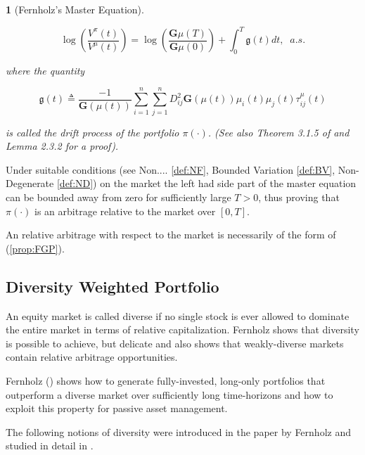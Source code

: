 \documentclass[british]{amsart}
\numberwithin{equation}{section}
\numberwithin{figure}{section}
\theoremstyle{plain}
\newtheorem{thm}{\protect\theoremname}[section]
\theoremstyle{definition}
\theoremstyle{plain}
\theoremstyle{plain}
\theoremstyle{plain}
\theoremstyle{remark}
\theoremstyle{plain}
\providecommand{\theoremname}{Theorem}
\begin{document}
\begin{thm} [Fernholz's Master Equation] \label{thm:masterequation}

  \begin{equation}
\log\left(\frac{V^{\pi}(t)}{V^{\mu}(t)}\right)=\log\left(\frac{\mathbf{G}\mu(T)}{\mathbf{G}\mu(0)}\right)+\int_{0}^{T}\mathfrak{g}(t)dt,\;\;a.s.
\end{equation}

where the quantity

  \begin{equation}
\mathfrak{g}(t)\triangleq\frac{-1}{\mathbf{G}(\mu(t))}\sum_{i=1}^{n}\sum_{j=1}^{n}D_{ij}^{2}\mathbf{G}(\mu(t))\mu_{i}(t)\mu_{j}(t)\tau_{ij}^{\mu}(t)
\end{equation}

is called the \textit{drift process} of the portfolio $\pi(\cdot)$. (See also
Theorem 3.1.5 of \cite{fernholz2002} and Lemma 2.3.2 for a proof).

\end{thm}

Under suitable conditions (see Non.... \ref{def:NF}, Bounded Variation
\ref{def:BV}, Non-Degenerate \ref{def:ND}) on the market the left had side part
of the master equation can be bounded away from zero for sufficiently large
$T>0$, thus proving that $\pi(\cdot)$ is an arbitrage relative to the market
over $[0,T]$.

An relative arbitrage with respect to the market is necessarily of the form of
(\ref{prop:FGP}).

\newpage 

\subsection{Diversity Weighted Portfolio}

An equity market is called diverse if no single stock is ever allowed to
dominate the entire market in terms of relative capitalization. Fernholz
\cite{fernholz2005} shows that diversity is possible to achieve, but delicate
and also shows that weakly-diverse markets contain relative arbitrage
opportunities.

Fernholz (\cite{fernholz2002}) shows how to generate fully-invested, long-only
portfolios that outperform a diverse market over sufficiently long time-horizons
and how to exploit this property for passive asset management.

The following notions of diversity were introduced in the paper by Fernholz
\cite{fernholz1999diversity} and studied in detail in \cite{fernholz2002}.
\end{document}
